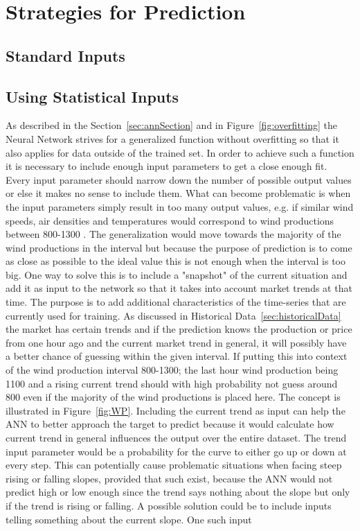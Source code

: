 \section{Strategies for Prediction}
\label{sec:stratsForPrediction}
\subsection{Standard Inputs}

\subsection{Using Statistical Inputs}
\label{sec:usingStatisticalInput}
As described in the Section~\ref{sec:annSection} and in Figure~\ref{fig:overfitting} the Neural Network strives for a generalized function without overfitting so that it also applies for data outside of the trained set. In order to achieve such a function it is necessary to include enough input parameters to get a close enough fit. Every input parameter should narrow down the number of possible output values or else it makes no sense to include them. What can become problematic is when the input parameters simply result in too many output values, e.g. if similar wind speeds, air densities and temperatures would correspond to wind productions between 800-1300 . The generalization would move towards the majority of the wind productions in the interval but because the purpose of prediction is to come as close as possible to the ideal value this is not enough when the interval is too big. One way to solve this is to include a "snapshot" of the current situation and add it as input to the network so that it takes into account market trends at that time. The purpose is to add additional characteristics of the time-series that are currently used for training. As discussed in Historical Data~\ref{sec:historicalData} the market has certain trends and if the prediction knows the production or price from one hour ago and the current market trend in general, it will possibly have a better chance of guessing within the given interval. If putting this into context of the wind production interval 800-1300; the last hour wind production being 1100 and a rising current trend should with high probability not guess around 800 even if the majority of the wind productions is placed here. The concept is illustrated in Figure~\ref{fig:WP}. Including the current trend as input can help the ANN to better approach the target to predict because it  would calculate how current trend in general influences the output over the entire dataset. The trend input parameter would be a probability for the curve to either go up or down at every step. This can potentially cause problematic situations when facing steep rising or falling slopes, provided that such exist, because the ANN would not predict high or low enough since the trend says nothing about the slope but only if the trend is rising or falling. A possible solution could be to include inputs telling something about the current slope. One such input 